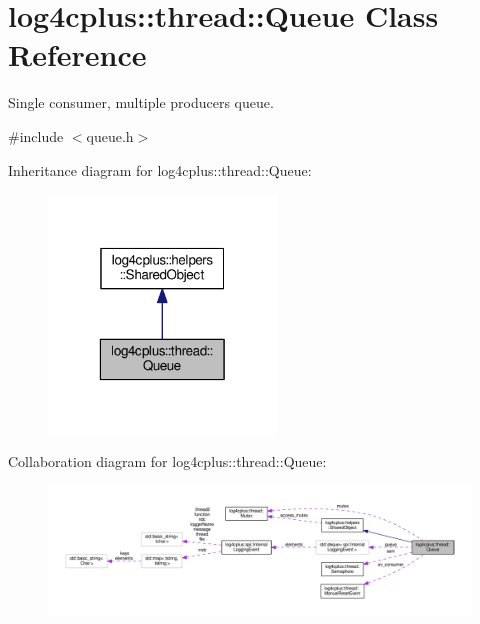 \hypertarget{classlog4cplus_1_1thread_1_1Queue}{\section{log4cplus\-:\-:thread\-:\-:Queue Class Reference}
\label{classlog4cplus_1_1thread_1_1Queue}
}


Single consumer, multiple producers queue.  




{\ttfamily \#include $<$queue.\-h$>$}



Inheritance diagram for log4cplus\-:\-:thread\-:\-:Queue\-:
\nopagebreak
\begin{figure}[H]
\begin{center}
\leavevmode
\includegraphics[width=172pt]{classlog4cplus_1_1thread_1_1Queue__inherit__graph}
\end{center}
\end{figure}


Collaboration diagram for log4cplus\-:\-:thread\-:\-:Queue\-:
\nopagebreak
\begin{figure}[H]
\begin{center}
\leavevmode
\includegraphics[width=350pt]{classlog4cplus_1_1thread_1_1Queue__coll__graph}
\end{center}
\end{figure}
